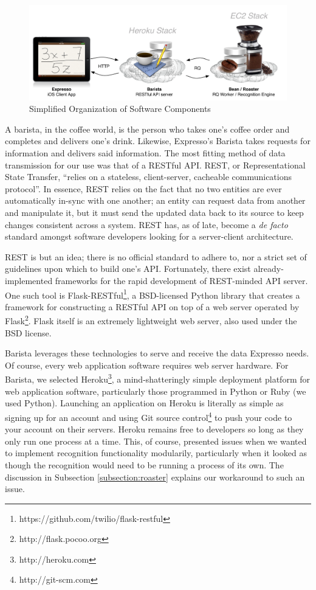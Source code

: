 \documentclass{acm_proc_article-sp}
\begin{document}
\begin{figure}
\centering
\includegraphics[width=1.0\textwidth]{final_chart.pdf}
\caption{Simplified Organization of Software Components}
\label{fig:final_chart}
\end{figure}

A barista, in the coffee world, is the person who takes one's coffee order and completes and delivers one's drink. Likewise, Expresso's Barista takes requests for information and delivers said information. The most fitting method of data transmission for our use was that of a RESTful API. REST, or Representational State Transfer, ``relies on a stateless, client-server, cacheable communications protocol''\cite{elkstein_rest_2008}. In essence, REST relies on the fact that no two entities are ever automatically in-sync with one another; an entity can request data from another and manipulate it, but it must send the updated data back to its source to keep changes consistent across a system. REST has, as of late, become a \emph{de facto} standard amongst software developers looking for a server-client architecture. 

REST is but an idea; there is no official standard to adhere to, nor a strict set of guidelines upon which to build one's API. Fortunately, there exist already-implemented frameworks for the rapid development of REST-minded API server. One such tool is Flask-RESTful\footnote{https://github.com/twilio/flask-restful}, a BSD-licensed Python library that creates a framework for constructing a RESTful API on top of a web server operated by Flask\footnote{http://flask.pocoo.org}. Flask itself is an extremely lightweight web server, also used under the BSD license.

Barista leverages these technologies to serve and receive the data Expresso needs. Of course, every web application software requires web server hardware. For Barista, we selected Heroku\footnote{http://heroku.com}, a mind-shatteringly simple deployment platform for web application software, particularly those programmed in Python or Ruby (we used Python). Launching an application on Heroku is literally as simple as signing up for an account and using Git source control\footnote{http://git-scm.com} to push your code to your account on their servers. Heroku remains free to developers so long as they only run one process at a time. This, of course, presented issues when we wanted to implement recognition functionality modularily, particularly when it looked as though the recognition would need to be running a process of its own. The discussion in Subsection \ref{subsection:roaster} explains our workaround to such an issue.
\end{document}
